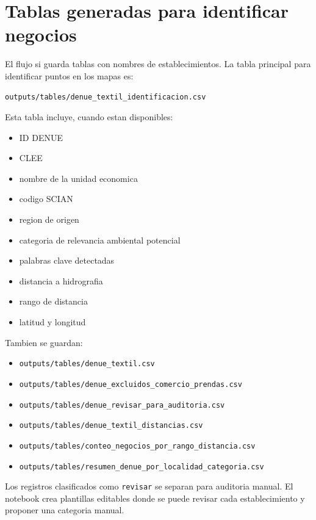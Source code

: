 \documentclass[11pt,letterpaper]{article}
\begin{document}
\section{Tablas generadas para identificar negocios}

El flujo si guarda tablas con nombres de establecimientos. La tabla principal para identificar puntos en los mapas es:

\begin{verbatim}
outputs/tables/denue_textil_identificacion.csv
\end{verbatim}

Esta tabla incluye, cuando estan disponibles:

\begin{itemize}
  \item ID DENUE
  \item CLEE
  \item nombre de la unidad economica
  \item codigo SCIAN
  \item region de origen
  \item categoria de relevancia ambiental potencial
  \item palabras clave detectadas
  \item distancia a hidrografia
  \item rango de distancia
  \item latitud y longitud
\end{itemize}

Tambien se guardan:

\begin{itemize}
  \item \texttt{outputs/tables/denue\_textil.csv}
  \item \texttt{outputs/tables/denue\_excluidos\_comercio\_prendas.csv}
  \item \texttt{outputs/tables/denue\_revisar\_para\_auditoria.csv}
  \item \texttt{outputs/tables/denue\_textil\_distancias.csv}
  \item \texttt{outputs/tables/conteo\_negocios\_por\_rango\_distancia.csv}
  \item \texttt{outputs/tables/resumen\_denue\_por\_localidad\_categoria.csv}
\end{itemize}

Los registros clasificados como \texttt{revisar} se separan para auditoria manual. El notebook  crea plantillas editables donde se puede revisar cada establecimiento y proponer una categoria manual.
\end{document}
